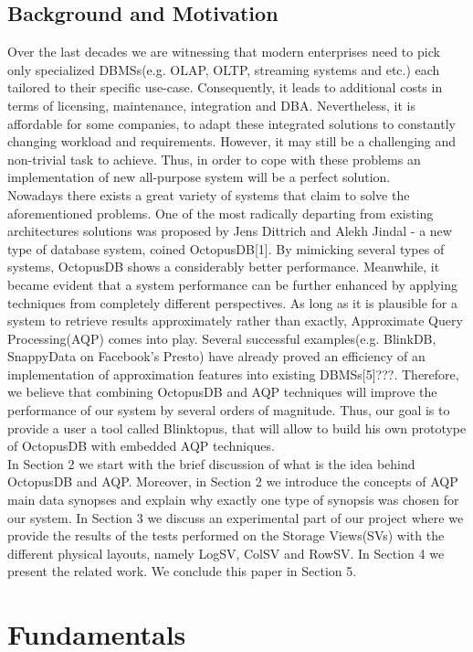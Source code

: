 \documentclass[10pt, conference, compsocconf]{IEEEtran}
\begin{document}
\subsection{Background and Motivation}
Over the last decades we are witnessing that modern enterprises need to pick only  specialized DBMSs(e.g. OLAP, OLTP, streaming systems and etc.) each tailored to their specific use-case. Consequently, it leads to additional costs in terms of licensing, maintenance, integration and DBA. Nevertheless, it is affordable for some companies, to adapt these integrated solutions to constantly changing workload and requirements. However, it may still be a challenging and non-trivial task to achieve. Thus, in order to cope with these problems an implementation of new all-purpose system will be a perfect solution. \\ Nowadays there exists a great variety of systems that claim to solve the aforementioned problems. One of the most radically departing from existing architectures solutions was proposed by Jens Dittrich and Alekh Jindal - a new type of database system, coined OctopusDB[1]. By mimicking several types of systems, OctopusDB shows a considerably better performance. Meanwhile, it became evident that a system performance can be further enhanced by applying techniques from completely different perspectives. As long as it is plausible for a system to retrieve results approximately rather than exactly, Approximate Query Processing(AQP) comes into play. Several successful examples(e.g. BlinkDB, SnappyData on Facebook's Presto) have already proved an efficiency of an implementation of approximation features into existing DBMSs[5]???. Therefore, we believe that combining OctopusDB and AQP techniques will improve the performance of our system by several orders of magnitude. 
Thus, our goal is to provide a user a tool called Blinktopus, that will allow  to build his own prototype of OctopusDB with embedded AQP techniques.\\
In Section 2 we start with the brief discussion of what is the idea behind OctopusDB and AQP. Moreover, in Section 2 we introduce the concepts of AQP main data synopses and explain why exactly one type of synopsis was chosen for our system. In Section 3 we discuss an experimental part of our project where we provide the results of the tests performed on the Storage Views(SVs) with the different physical layouts, namely LogSV, ColSV and RowSV. In Section 4 we present the related work. We conclude this paper in Section 5.

\section{Fundamentals}
\end{document}
